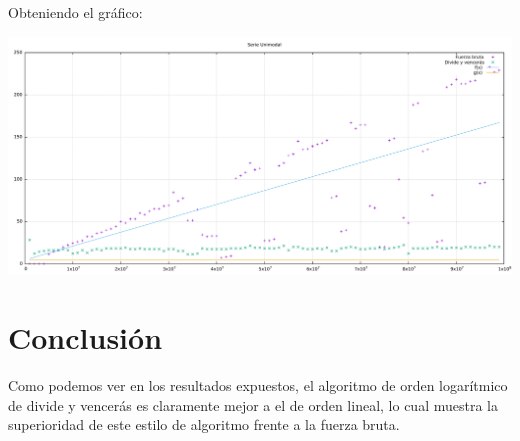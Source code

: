 \documentclass[a4paper, 11pt]{article}
\begin{document}
Obteniendo el gráfico:
\begin{center}
	\includegraphics[scale=0.22]{ajuste.pdf}
\end{center}

\section{Conclusión}
Como podemos ver en los resultados expuestos, el algoritmo de orden logarítmico de divide y vencerás es claramente mejor a el de orden lineal, lo cual muestra la superioridad de este estilo de algoritmo frente a la fuerza bruta.
\end{document}
